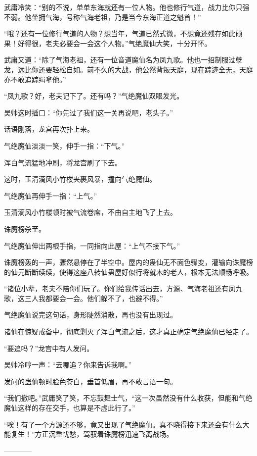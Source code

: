 \begin{this_body}
武庸冷笑：“别的不说，单单东海就还有一位人物。他也修行气道，战力比你只强不弱。他坐拥气海，号称气海老祖，乃是当今东海正道之魁首！”

“哦？还有一位修行气道的人物？想当年，气道已然式微，不想竟还残存如此硕果！好得很，老夫必要会一会这个人物。”气绝魔仙大笑，十分开怀。

武庸又道：“除了气海老祖，还有一位音道魔仙名为凤九歌。他也一招制服过孽龙，远比你还要轻松自如。前不久的大战，他公然背叛天庭，现在踪迹全无，天庭亦不敢追踪缉拿他。”

“凤九歌？好，老夫记下了。还有吗？”气绝魔仙双眼发光。

吴帅这时插口：“你先过了我们这一关再说吧，老头子。”

话语刚落，龙宫再次扑上来。

气绝魔仙淡淡一笑，伸手一指：“下气。”

浑白气流猛地冲刷，将龙宫刷了下去。

这时，玉清滴风小竹楼夹裹风暴，撞向气绝魔仙。

气绝魔仙再伸手一指：“上气。”

玉清滴风小竹楼顿时被气流卷席，不由自主地飞了上去。

诛魔榜杀至。

气绝魔仙伸出两根手指，一同指向此屋：“上气不接下气。”

诛魔榜轰的一声，骤然悬停在了半空中。屋内的蛊仙无不面色骤变，灌输向诛魔榜的仙元断断续续，使得这座八转仙蛊屋好似行将就木的老人，根本无法顺畅呼吸。

“诸位小辈，老夫不陪你们玩了。你们给我传话出去，方源、气海老祖还有凤九歌，这三人我都要会一会。他们躲不了，也避不得。”

气绝魔仙说完这句话，身形陡然消散，再也没有出现过。

诸仙在惊疑戒备中，彻底剿灭了浑白气流之后，这才真正确定气绝魔仙已经走了。

“要追吗？”龙宫中有人发问。

吴帅冷哼一声：“去哪追？你来告诉我啊。”

发问的蛊仙顿时脸色苍白，垂首低眉，再不敢言语一句。

“我们撤吧。”武庸笑了笑，不忘鼓舞士气，“这一次虽然没有什么收获，但能和气绝魔仙这样的存在交手，也算是不虚此行了。”

“唉！有了一个方源还不够，竟又出现了气绝魔仙。真不晓得接下来还会有什么大能复生！”方正沉重忧愁，驾驭着诛魔榜迅速飞离战场。

------------

\end{this_body}

